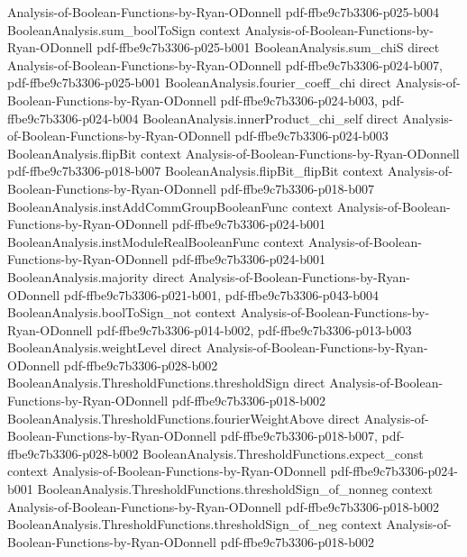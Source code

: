 \begin{theorem}
  {Analysis-of-Boolean-Functions-by-Ryan-ODonnell}
  {pdf-ffbe9c7b3306-p025-b004}
\proofstep
  {BooleanAnalysis.sum_boolToSign}
  {context}
  {Analysis-of-Boolean-Functions-by-Ryan-ODonnell}
  {pdf-ffbe9c7b3306-p025-b001}
\proofstep
  {BooleanAnalysis.sum_chiS}
  {direct}
  {Analysis-of-Boolean-Functions-by-Ryan-ODonnell}
  {pdf-ffbe9c7b3306-p024-b007,
    pdf-ffbe9c7b3306-p025-b001}
\proofstep
  {BooleanAnalysis.fourier_coeff_chi}
  {direct}
  {Analysis-of-Boolean-Functions-by-Ryan-ODonnell}
  {pdf-ffbe9c7b3306-p024-b003,
    pdf-ffbe9c7b3306-p024-b004}
\proofstep
  {BooleanAnalysis.innerProduct_chi_self}
  {direct}
  {Analysis-of-Boolean-Functions-by-Ryan-ODonnell}
  {pdf-ffbe9c7b3306-p024-b003}
\proofstep
  {BooleanAnalysis.flipBit}
  {context}
  {Analysis-of-Boolean-Functions-by-Ryan-ODonnell}
  {pdf-ffbe9c7b3306-p018-b007}
\proofstep
  {BooleanAnalysis.flipBit_flipBit}
  {context}
  {Analysis-of-Boolean-Functions-by-Ryan-ODonnell}
  {pdf-ffbe9c7b3306-p018-b007}
\proofstep
  {BooleanAnalysis.instAddCommGroupBooleanFunc}
  {context}
  {Analysis-of-Boolean-Functions-by-Ryan-ODonnell}
  {pdf-ffbe9c7b3306-p024-b001}
\proofstep
  {BooleanAnalysis.instModuleRealBooleanFunc}
  {context}
  {Analysis-of-Boolean-Functions-by-Ryan-ODonnell}
  {pdf-ffbe9c7b3306-p024-b001}
\proofstep
  {BooleanAnalysis.majority}
  {direct}
  {Analysis-of-Boolean-Functions-by-Ryan-ODonnell}
  {pdf-ffbe9c7b3306-p021-b001,
    pdf-ffbe9c7b3306-p043-b004}
\proofstep
  {BooleanAnalysis.boolToSign_not}
  {context}
  {Analysis-of-Boolean-Functions-by-Ryan-ODonnell}
  {pdf-ffbe9c7b3306-p014-b002,
    pdf-ffbe9c7b3306-p013-b003}
\proofstep
  {BooleanAnalysis.weightLevel}
  {direct}
  {Analysis-of-Boolean-Functions-by-Ryan-ODonnell}
  {pdf-ffbe9c7b3306-p028-b002}
\proofstep
  {BooleanAnalysis.ThresholdFunctions.thresholdSign}
  {direct}
  {Analysis-of-Boolean-Functions-by-Ryan-ODonnell}
  {pdf-ffbe9c7b3306-p018-b002}
\proofstep
  {BooleanAnalysis.ThresholdFunctions.fourierWeightAbove}
  {direct}
  {Analysis-of-Boolean-Functions-by-Ryan-ODonnell}
  {pdf-ffbe9c7b3306-p018-b007,
    pdf-ffbe9c7b3306-p028-b002}
\proofstep
  {BooleanAnalysis.ThresholdFunctions.expect_const}
  {context}
  {Analysis-of-Boolean-Functions-by-Ryan-ODonnell}
  {pdf-ffbe9c7b3306-p024-b001}
\proofstep
  {BooleanAnalysis.ThresholdFunctions.thresholdSign_of_nonneg}
  {context}
  {Analysis-of-Boolean-Functions-by-Ryan-ODonnell}
  {pdf-ffbe9c7b3306-p018-b002}
\proofstep
  {BooleanAnalysis.ThresholdFunctions.thresholdSign_of_neg}
  {context}
  {Analysis-of-Boolean-Functions-by-Ryan-ODonnell}
  {pdf-ffbe9c7b3306-p018-b002}
\proofstep

\end{theorem}

